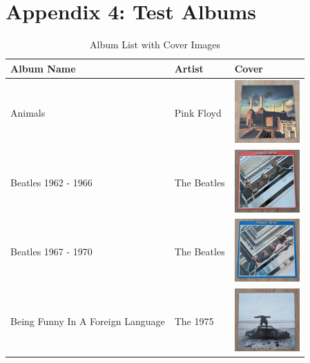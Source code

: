 \chapter{Appendix 4: Test Albums} \label{apd:test_albums}
\begin{table}[h]
    \centering
    \renewcommand{\arraystretch}{1.5} %
    \setlength{\tabcolsep}{10pt}      %
    \begin{tabular}{|m{4cm}|m{4cm}|m{4cm}|} %
        \hline
        \textbf{Album Name} & \textbf{Artist} & \textbf{Cover} \\
        \hline
        Animals & Pink Floyd & \includegraphics[width=2.5cm]{figures/test_albums/Animals.jpg} \\
        \hline
        Beatles 1962 - 1966 & The Beatles & \includegraphics[width=2.5cm]{figures/test_albums/Beatles 62-66.jpg} \\
        \hline
        Beatles 1967 - 1970 & The Beatles & \includegraphics[width=2.5cm]{figures/test_albums/Beatles 67-70.jpg} \\
        \hline
        Being Funny In A Foreign Language & The 1975 & \includegraphics[width=2.5cm]{figures/test_albums/Being Funny In A Foreign Language.jpg} \\
        \hline
    \end{tabular}
    \caption{Album List with Cover Images}
    \label{tab:albums-list1}
\end{table}

